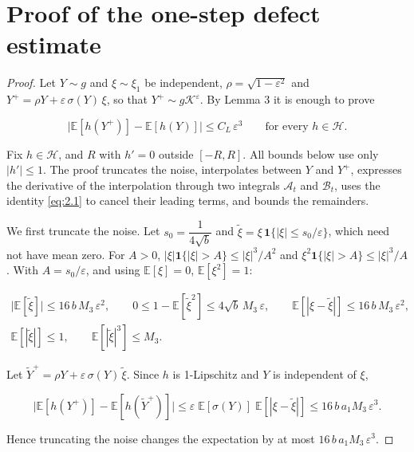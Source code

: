 \documentclass[aip,jmp,preprint,onecolumn,floatfix,superscriptaddress,nofootinbib,11pt]{revtex4-2}
\theoremstyle{plain}
\theoremstyle{remark}
\numberwithin{equation}{section}
\newcommand{\E}{\mathbb{E}}
\newcommand{\eps}{\varepsilon}
\begin{document}
\appendix

\section{Proof of the one-step defect estimate}\label{app:defect}

\begin{proof} Let $Y\sim g$ and $\xi\sim\xi_1$ be independent, $\rho=\sqrt{1-\eps^{2}}$ and $Y^{+}=\rho Y+\eps\,\sigma(Y)\,\xi$, so that $Y^{+}\sim g\mathcal K^{\eps}$. By Lemma 3 it is enough to prove

\begin{equation*}
\big|\E[h(Y^{+})]-\E[h(Y)]\big|\le C_L\,\eps^{3}\qquad\text{for every }h\in\mathcal H.
\end{equation*}

Fix $h\in\mathcal H$, and $R$ with $h'=0$ outside $[-R,R]$. All bounds below use only $|h'|\le1$. The proof truncates the noise, interpolates between $Y$ and $Y^{+}$, expresses the derivative of the interpolation through two integrals $\mathcal A_t$ and $\mathcal B_t$, uses the identity \eqref{eq:2.1} to cancel their leading terms, and bounds the remainders.

We first truncate the noise. Let $s_0=\dfrac{1}{4\sqrt b}$ and $\tilde\xi=\xi\,\mathbf 1\{|\xi|\le s_0/\eps\}$, which need not have mean zero. For $A>0$, $|\xi|\mathbf 1\{|\xi|>A\}\le|\xi|^{3}/A^{2}$ and $\xi^{2}\mathbf 1\{|\xi|>A\}\le|\xi|^{3}/A$. With $A=s_0/\eps$, and using $\E[\xi]=0$, $\E[\xi^{2}]=1$:

\begin{equation}
\begin{gathered} \big|\E[\tilde\xi]\big|\le16\,b\,M_3\,\eps^{2},\qquad 0\le1-\E[\tilde\xi^{2}]\le4\sqrt b\,M_3\,\eps,\qquad \E[|\xi-\tilde\xi|]\le16\,b\,M_3\,\eps^{2},\\[4pt] \E[|\tilde\xi|]\le1,\qquad \E[|\tilde\xi|^{3}]\le M_3 . \end{gathered}
\label{eq:4.8}
\end{equation}

Let $\tilde Y^{+}=\rho Y+\eps\,\sigma(Y)\,\tilde\xi$. Since $h$ is 1-Lipschitz and $Y$ is independent of $\xi$,

\begin{equation}
\big|\E[h(Y^{+})]-\E[h(\tilde Y^{+})]\big|\le\eps\;\E[\sigma(Y)]\;\E[|\xi-\tilde\xi|]\le16\,b\,a_1M_3\,\eps^{3}.
\label{eq:4.9}
\end{equation}

Hence truncating the noise changes the expectation by at most $16\,b\,a_1M_3\,\eps^{3}$.


\end{proof}
\end{document}
